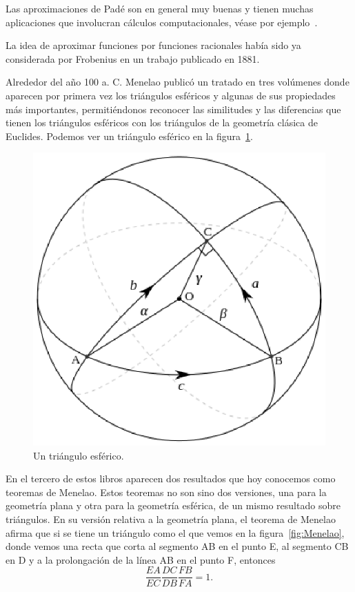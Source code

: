 Las aproximaciones de Padé son en general muy buenas y tienen muchas
aplicaciones que involucran cálculos computacionales, véase por
ejemplo~\cite{MR1383091}.  

La idea de aproximar funciones por funciones
racionales había sido ya considerada por Frobenius en un trabajo publicado en
1881.  

Alrededor del año 100 a. C. Menelao publicó un tratado en tres volúmenes donde
aparecen por primera vez los triángulos esféricos y algunas de sus propiedades
más importantes, permitiéndonos reconocer las similitudes y las diferencias que
tienen los triángulos esféricos con los triángulos de la geometría clásica de
Euclides.  Podemos ver un triángulo esférico en la figura~\ref{fig:esferico}.

\begin{figure}[h]
   \centering
   \includegraphics[scale=0.4]{images/esferico}
   \caption{Un triángulo esférico.}
   \label{fig:esferico}
\end{figure}

En el tercero de estos libros aparecen dos resultados que hoy conocemos como teoremas de
Menelao. Estos teoremas no son sino dos versiones, una para la geometría plana y otra para
la geometría esférica, de un mismo resultado sobre triángulos.  En su versión
relativa a la geometría plana, el teorema de Menelao afirma que si se tiene un
triángulo como el que vemos en la figura~\ref{fig:Menelao}, donde vemos una
recta que corta al segmento AB en el punto E, al segmento CB en D y a la
prolongación de la línea AB en el punto F, entonces 
\[
	\frac{EA}{EC}\frac{DC}{DB}\frac{FB}{FA}=1.
\]

